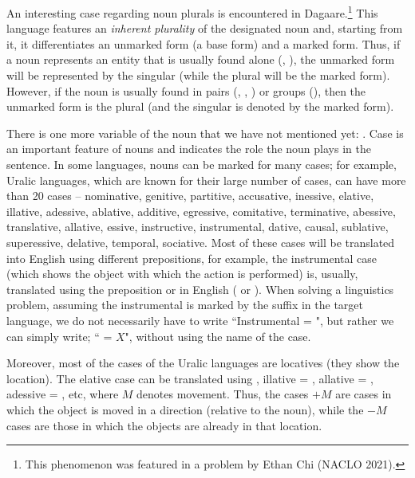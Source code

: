 \begin{refsection}
An interesting case regarding noun plurals is encountered in Dagaare.\footnote{This phenomenon was featured in a problem by Ethan Chi (NACLO 2021).} This language features an \textit{inherent plurality} of the designated noun and, starting from it, it differentiates an unmarked form (a base form) and a marked form. Thus, if a noun represents an entity that is usually found alone (, ), the unmarked form will be represented by the singular (while the plural will be the marked form). However, if the noun is usually found in pairs (, , ) or groups (), then the unmarked form is the plural (and the singular is denoted by the marked form).

There is one more variable of the noun that we have not mentioned yet: . Case is an important feature of nouns and indicates the role the noun plays in the sentence. In some languages, nouns can be marked for many cases; for example, Uralic languages, which are known for their large number of cases, can have more than 20 cases -- nominative, genitive, partitive, accusative, inessive, elative, illative, adessive, ablative, additive, egressive, comitative, terminative, abessive, translative, allative, essive, instructive, instrumental, dative, causal, sublative, superessive, delative, temporal, sociative. Most of these cases will be translated into English using different prepositions, for example, the instrumental case (which shows the object with which the action is performed) is, usually, translated using the preposition  or  in English ( or ). When solving a linguistics problem, assuming the instrumental is marked by the suffix  in the target language, we do not necessarily have to write “Instrumental = ", but rather we can simply write; “ = $X$", without using the name of the case.

Moreover, most of the cases of the Uralic languages are locatives (they show the location). The elative case can be translated using , illative = , allative = , adessive = , etc, where $M$ denotes movement. Thus, the cases $+M$ are cases in which the object is moved in a direction (relative to the noun), while the $-M$ cases are those in which the objects are already in that location.


\end{refsection}
